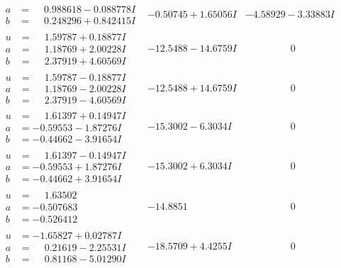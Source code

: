 \documentclass[1p]{elsarticle_modified}
\theoremstyle{definition}
\begin{document}
$$\begin{array}{c|c|c}
\begin{aligned}
a &= \phantom{-}0.988618 - 0.088778 I \\
b &= \phantom{-}0.248296 + 0.842415 I\end{aligned}
 & -0.50745 + 1.65056 I & -4.58929 - 3.33883 I \\ \hline\begin{aligned}
u &= \phantom{-}1.59787 + 0.18877 I \\
a &= \phantom{-}1.18769 + 2.00228 I \\
b &= \phantom{-}2.37919 + 4.60569 I\end{aligned}
 & -12.5488 - 14.6759 I & \phantom{-0.000000 } 0 \\ \hline\begin{aligned}
u &= \phantom{-}1.59787 - 0.18877 I \\
a &= \phantom{-}1.18769 - 2.00228 I \\
b &= \phantom{-}2.37919 - 4.60569 I\end{aligned}
 & -12.5488 + 14.6759 I & \phantom{-0.000000 } 0 \\ \hline\begin{aligned}
u &= \phantom{-}1.61397 + 0.14947 I \\
a &= -0.59553 - 1.87276 I \\
b &= -0.44662 - 3.91654 I\end{aligned}
 & -15.3002 - 6.3034 I & \phantom{-0.000000 } 0 \\ \hline\begin{aligned}
u &= \phantom{-}1.61397 - 0.14947 I \\
a &= -0.59553 + 1.87276 I \\
b &= -0.44662 + 3.91654 I\end{aligned}
 & -15.3002 + 6.3034 I & \phantom{-0.000000 } 0 \\ \hline\begin{aligned}
u &= \phantom{-}1.63502\phantom{ +0.000000I} \\
a &= -0.507683\phantom{ +0.000000I} \\
b &= -0.526412\phantom{ +0.000000I}\end{aligned}
 & -14.8851\phantom{ +0.000000I} & \phantom{-0.000000 } 0 \\ \hline\begin{aligned}
u &= -1.65827 + 0.02787 I \\
a &= \phantom{-}0.21619 - 2.25531 I \\
b &= \phantom{-}0.81168 - 5.01290 I\end{aligned}
 & -18.5709 + 4.4255 I & \phantom{-0.000000 } 0\\

\end{array}$$
\end{document}
